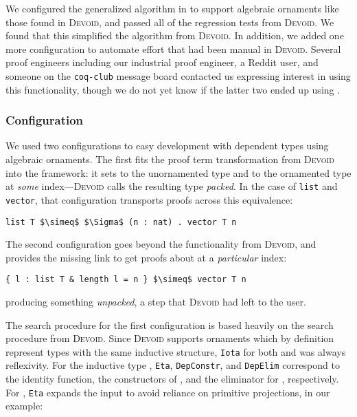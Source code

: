 We configured the generalized algorithm in \toolname to support algebraic ornaments like those found in \textsc{Devoid},
and passed all of the regression tests from \textsc{Devoid}.
We found that this simplified the algorithm from \textsc{Devoid}.
In addition, we added one more configuration to automate effort that had been manual in \textsc{Devoid}.
Several proof engineers including our industrial proof engineer, a Reddit user,
and someone on the \lstinline{coq-club} message board contacted us expressing interest in using this functionality,
though we do not yet know if the latter two ended up using \toolname. %

\subsubsection{Configuration}

We used two configurations to easy development with dependent types using algebraic ornaments.
The first fits the proof term transformation from \textsc{Devoid} into the \toolname framework:
it sets \A to the unornamented type and \B to the ornamented type at \textit{some} index---\textsc{Devoid}
calls the resulting type \textit{packed}.
In the case of \lstinline{list} and \lstinline{vector}, that configuration
transports proofs across this equivalence:

\begin{lstlisting}
list T $\simeq$ $\Sigma$ (n : nat) . vector T n
\end{lstlisting}
The second configuration goes beyond the functionality from \textsc{Devoid}, and provides
the missing link to get proofs about \B at a \textit{particular} index:

\begin{lstlisting}
{ l : list T & length l = n } $\simeq$ vector T n
\end{lstlisting}
producing something \textit{unpacked},
a step that \textsc{Devoid} had left to the user.

The search procedure for the first configuration is based heavily on the search procedure from \textsc{Devoid}.
Since \textsc{Devoid} supports ornaments which by definition represent types with the same inductive structure,
\lstinline{Iota} for both \A and \B was always reflexivity.
For the inductive type \A, \lstinline{Eta}, \lstinline{DepConstr}, and \lstinline{DepElim}
correspond to the identity function, the constructors of \A, and the eliminator for \A, respectively.
For \B, \lstinline{Eta} expands the input to avoid reliance on primitive projections,
in our example:

